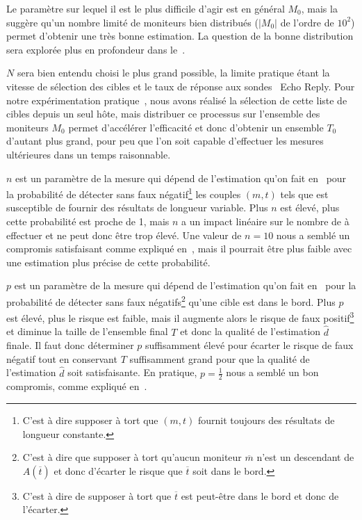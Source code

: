 Le paramètre sur lequel il est le plus difficile d'agir est en général $M_0$,
mais la~ suggère qu'un nombre limité de moniteurs bien
distribués ($|M_0|$ de l'ordre de $10^2$) permet d'obtenir une très bonne
estimation. La question de la bonne distribution sera explorée plus en
profondeur dans le~.

$N$ sera bien entendu choisi le plus grand possible, la limite pratique étant la
vitesse de sélection des cibles et le taux de réponse aux sondes \icmp~{\sc Echo
Reply}. Pour notre expérimentation pratique~,
nous avons réalisé la sélection de cette liste de cibles depuis un seul hôte,
mais distribuer ce processus sur l'ensemble des moniteurs $M_0$ permet
d'accélérer l'efficacité et donc d'obtenir un ensemble
$T_0$ d'autant plus grand, pour peu que l'on soit capable d'effectuer les
mesures ultérieures dans un temps raisonnable.

$n$ est un paramètre de la mesure qui dépend de l'estimation qu'on fait
en~ pour la probabilité de détecter sans faux
négatif\footnote{C'est à dire supposer à tort que $(m, t)$ fournit toujours des
résultats de longueur constante.} les couples $(m, t)$ tels que \traceroute est
susceptible de fournir des résultats de longueur variable. Plus $n$ est élevé,
plus cette probabilité est proche de 1, mais $n$ a un impact linéaire sur le
nombre de \traceroute à effectuer et ne peut donc être trop élevé. Une valeur de
$n = 10$ nous a semblé un compromis satisfaisant comme expliqué
en~, mais il pourrait être plus faible avec une
estimation plus précise de cette probabilité.

$p$ est un paramètre de la mesure qui dépend de l'estimation qu'on fait
en~ pour la probabilité de détecter sans faux
négatifs\footnote{C'est à dire que supposer à tort qu'aucun moniteur
$\overline{m}$ n'est un descendant de $A(\overline{t})$ et donc d'écarter le
risque que $\overline{t}$ soit dans le bord.} qu'une cible est dans le bord.
Plus $p$ est élevé, plus le risque est faible, mais il augmente alors le risque
de faux positif\footnote{C'est à dire de supposer à tort que $\overline{t}$ est
peut-être dans le bord et donc de l'écarter.} et diminue la taille de l'ensemble
final $T$ et donc la qualité de l'estimation $\hat{d}$ finale. Il faut donc
déterminer $p$ suffisamment élevé pour écarter le risque de faux négatif tout en
conservant $T$ suffisamment grand pour que la qualité de l'estimation $\hat{d}$
soit satisfaisante. En pratique, $p = \frac{1}{2}$ nous a semblé un bon
compromis, comme expliqué en~.

